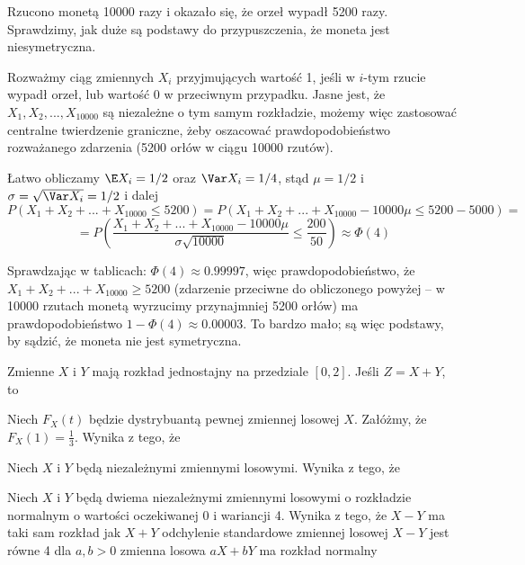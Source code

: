\begin{example}
    Rzucono monetą 10000 razy i okazało się, że orzeł wypadł 5200 razy. Sprawdzimy, jak duże są podstawy do przypuszczenia, że moneta jest niesymetryczna.

    Rozważmy ciąg zmiennych $X_i$ przyjmujących wartość 1, jeśli w $i$-tym rzucie wypadł orzeł, lub wartość 0 w przeciwnym przypadku. Jasne jest, że $X_1, X_2, ..., X_{10000}$ są niezależne o tym samym rozkładzie, możemy więc zastosować centralne twierdzenie graniczne, żeby oszacować prawdopodobieństwo rozważanego zdarzenia (5200 orłów w ciągu 10000 rzutów).

    Łatwo obliczamy $\E X_i = 1/2$ oraz $\Var X_i = 1/4$, stąd $\mu = 1/2$ i $\sigma = \sqrt{\Var X_i} = 1/2$ i dalej
    $$P(X_1 + X_2 + ... + X_{10000} \leq 5200) = P(X_1 + X_2 + ... + X_{10000} - 10000\mu \leq 5200 - 5000) =$$
    $$= P\left(\frac{X_1 + X_2 + ... + X_{10000} - 10000 \mu}{\sigma \sqrt{10000}} \leq \frac{200}{50}\right) \approx \Phi(4)$$

    Sprawdzając w tablicach: $\Phi(4) \approx 0.99997$, więc prawdopodobieństwo, że $X_1 + X_2 + ... + X_{10000} \geq 5200$ (zdarzenie przeciwne do obliczonego powyżej -- w 10000 rzutach monetą wyrzucimy przynajmniej 5200 orłów) ma prawdopodobieństwo $1 - \Phi(4) \approx 0.00003$. To bardzo mało; są więc podstawy, by sądzić, że moneta nie jest symetryczna.
\end{example}

\begin{problems}
    \prob Zmienne $X$ i $Y$ mają rozkład jednostajny na przedziale $[0, 2]$. Jeśli $Z = X + Y$, to

    \prob Niech $F_{X}(t)$ będzie dystrybuantą pewnej zmiennej losowej $X$. Załóżmy, że $F_{X}(1)=\frac{1}{3}$. Wynika z tego, że

    \prob Niech $X$ i $Y$ będą niezależnymi zmiennymi losowymi. Wynika z tego, że

    \prob Niech $X$ i $Y$ będą dwiema niezależnymi zmiennymi losowymi o rozkładzie normalnym o wartości oczekiwanej 0 i wariancji 4. Wynika z tego, że
    \answers
    {$X - Y$ ma taki sam rozkład jak $X + Y$}
    {odchylenie standardowe zmiennej losowej $X - Y$ jest równe 4}
    {dla $a, b > 0$ zmienna losowa $aX + bY$ ma rozkład normalny}
\end{problems}

